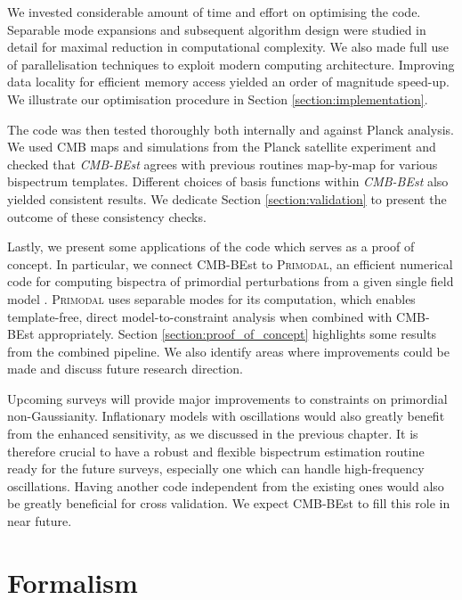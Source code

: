 We invested considerable amount of time and effort on optimising the code. Separable mode expansions and subsequent algorithm design were studied in detail for maximal reduction in computational complexity. We also made full use of parallelisation techniques to exploit modern computing architecture. Improving data locality for efficient memory access yielded an order of magnitude speed-up. We illustrate our optimisation procedure in Section \ref{section:implementation}.

The code was then tested thoroughly both internally and against Planck analysis. We used CMB maps and simulations from the Planck satellite experiment and checked that \textit{CMB-BEst} agrees with previous routines map-by-map for various bispectrum templates. Different choices of basis functions within \textit{CMB-BEst} also yielded consistent results. We dedicate Section \ref{section:validation} to present the outcome of these consistency checks.

Lastly, we present some applications of the code which serves as a proof of concept. In particular, we connect CMB-BEst to \textsc{Primodal}, an efficient numerical code for computing bispectra of primordial perturbations from a given single field model \cite{Clarke2021}. \textsc{Primodal} uses separable modes for its computation, which enables template-free, direct model-to-constraint analysis when combined with CMB-BEst appropriately. Section \ref{section:proof_of_concept} highlights some results from the combined pipeline. We also identify areas where improvements could be made and discuss future research direction.

Upcoming surveys will provide major improvements to constraints on primordial non-Gaussianity. Inflationary models with oscillations would also greatly benefit from the enhanced sensitivity, as we discussed in the previous chapter. It is therefore crucial to have a robust and flexible bispectrum estimation routine ready for the future surveys, especially one which can handle high-frequency oscillations. Having another code independent from the existing ones would also be greatly beneficial for cross validation. We expect CMB-BEst to fill this role in near future.


\section{Formalism}

